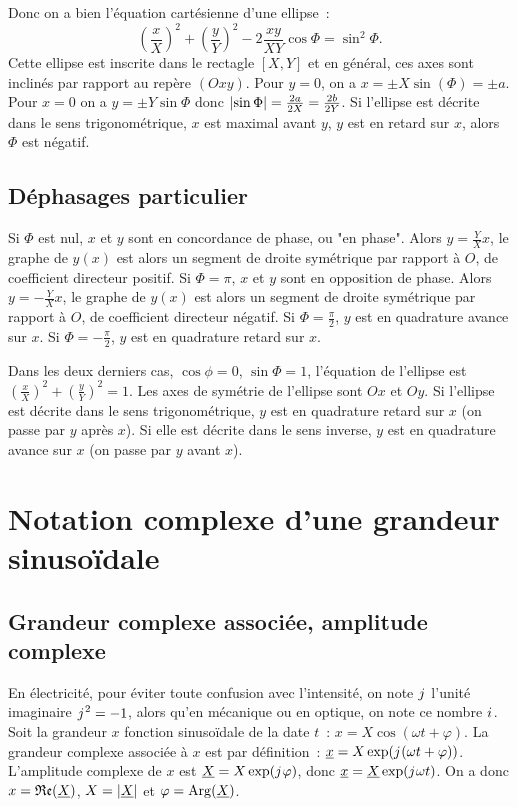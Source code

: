            Donc on a bien l'équation cartésienne d'une ellipse~:
            \begin{equation}
                \left(\frac{x}{X}\right)^2 + \left(\frac{y}{Y}\right)^2 - 2 \frac{xy}{XY} \cos\Phi = \sin^2\Phi.
            \end{equation}
            Cette ellipse est inscrite dans le rectagle \([X, Y]\) et en général, ces axes sont inclinés par rapport au repère \((Oxy)\). Pour \(y=0\), on a \(x = \pm X\sin(\Phi) = \pm a\). Pour \(x=0\) on a \(y = \pm Y\sin\Phi\) donc \(\left\lvert\sin\Phi\right\rvert = \frac{2a}{2X} = \frac{2b}{2Y}\). Si l'ellipse est décrite dans le sens trigonométrique, \(x\) est maximal avant \(y\), \(y\) est en retard sur \(x\), alors \(\Phi\) est négatif.
        \subsection{Déphasages particulier}
            Si \(\Phi\) est nul, \(x\) et \(y\) sont en concordance de phase, ou "en phase". Alors \(y=\frac{Y}{X} x\), le graphe de \(y(x)\) est alors un segment de droite symétrique par rapport à \(O\), de coefficient directeur positif. Si \(\Phi=\pi\), \(x\) et \(y\) sont en opposition de phase. Alors \(y=-\frac{Y}{X} x\), le graphe de \(y(x)\) est alors un segment de droite symétrique par rapport à \(O\), de coefficient directeur négatif. Si \(\Phi=\frac{\pi}{2}\), \(y\) est en quadrature avance sur \(x\). Si \(\Phi=-\frac{\pi}{2}\), \(y\) est en quadrature retard sur \(x\).

            Dans les deux derniers cas, \(\cos\phi = 0\), \(\sin\Phi=1\), l'équation de l'ellipse est \(\left(\frac{x}{X}\right)^2 + \left(\frac{y}{Y}\right)^2 = 1\). Les axes de symétrie de l'ellipse sont \(Ox\) et \(Oy\). Si l'ellipse est décrite dans le sens trigonométrique, \(y\) est en quadrature retard sur \(x\) (on passe par \(y\) après \(x\)). Si elle est décrite dans le sens inverse, \(y\) est en quadrature avance sur \(x\) (on passe par \(y\) avant \(x\)).
\section{Notation complexe d'une grandeur sinusoïdale}
    \label{sec:complexe}
    \subsection{Grandeur complexe associée, amplitude complexe}
        En électricité, pour éviter toute confusion avec l'intensité, on note \({j\mkern1mu}\) l'unité imaginaire \({j\mkern1mu}^2=-1\), alors qu'en mécanique ou en optique, on note ce nombre \({i\mkern1mu}\). Soit la grandeur \(x\) fonction sinusoïdale de la date \(t\)~: \(x = X\cos(\omega t +\varphi)\). La grandeur complexe associée à \(x\) est par définition~: \(\underline{x} = X\exp({j\mkern1mu}(\omega t +\varphi))\). L'amplitude complexe de \(x\) est \(\underline{X} = X\exp({j\mkern1mu} \varphi)\), donc \(\underline{x} = \underline{X} \exp({j\mkern1mu}\omega t)\). On a donc \(x = \mathfrak{Re}(\underline{X})\), \(X = \left\lvert\underline{X}\right\rvert\) et \(\varphi = \operatorname{Arg}(\underline{X})\).
